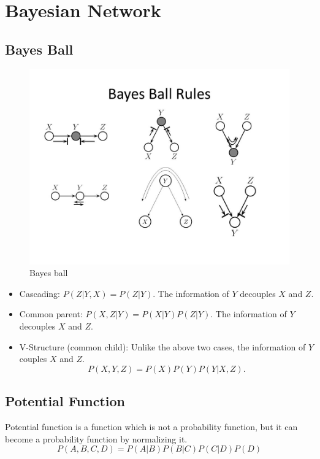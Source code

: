 \section{Bayesian Network}
\subsection{Bayes Ball}

\begin{figure}[h!]
	\centering
	\includegraphics[scale=0.3]{./images/hmm/bayes.jpg}
	\caption{Bayes ball}
	\label{fig:bayes}
\end{figure}

\begin{itemize}
	\item Cascading: $P(Z|Y,X) = P(Z|Y)$. The information of $Y$ decouples $X$ and $Z$.
	\item Common parent: $P(X,Z|Y) = P(X|Y)P(Z|Y)$. The information of $Y$ decouples $X$ and $Z$.
	\item V-Structure (common child): Unlike the above two cases, the information of $Y$ couples $X$ and $Z$.
		$$P(X,Y,Z) = P(X)P(Y)P(Y|X,Z).$$
\end{itemize}

\subsection{Potential Function}
Potential function is a function which is not a probability function, but it can become a probability function by normalizing it. 
$$P(A,B,C,D) = P(A|B)P(B|C)P(C|D)P(D)$$

